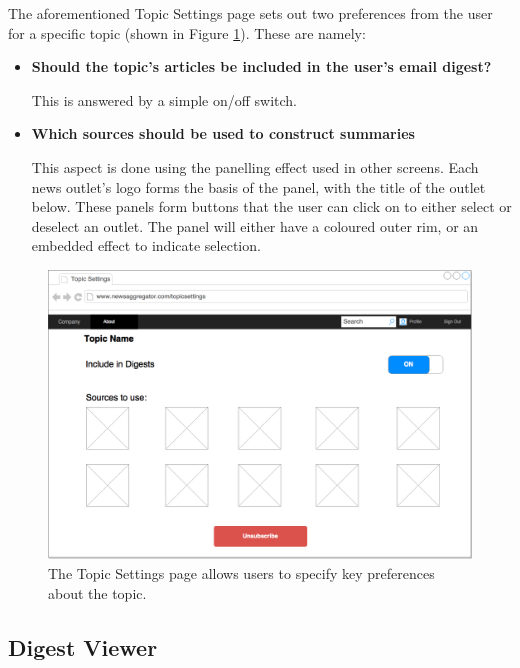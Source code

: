\documentclass[12pt]{article}
\begin{document}
\begin{appendices}
The aforementioned Topic Settings page sets out two preferences from the user for a specific topic (shown in Figure \ref{topicSettings}). These are namely: \\

\begin{itemize}
	\item \textbf{Should the topic's articles be included in the user's email digest?}
	
	This is answered by a simple on/off switch. 
	
	\item \textbf{Which sources should be used to construct summaries}
	
	This aspect is done using the panelling effect used in other screens. Each news outlet's logo forms the basis of the panel, with the title of the outlet below. These panels form buttons that the user can click on to either select or deselect an outlet. The panel will either have a coloured outer rim, or an embedded effect to indicate selection. \\
\end{itemize}

\label{topicsettings}

\begin{figure}[ht!]
  \centering
    \includegraphics[scale=0.3]{TopicSettings.png}
   \caption[A wireframe of the Topic Settings page]{The Topic Settings page allows users to specify key preferences about the topic.}
   \label{topicSettings}
\end{figure}

\subsection{Digest Viewer}


\end{appendices}
\end{document}
